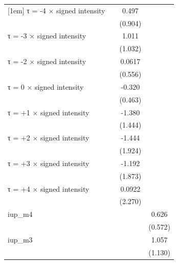 \begin{table}[htbp]
\begin{tabular}{l*{3}{c}}
[1em]
τ = -4 × signed intensity&                     &       0.497         &                     \\
                    &                     &     (0.904)         &                     \\
[1em]
τ = -3 × signed intensity&                     &       1.011         &                     \\
                    &                     &     (1.032)         &                     \\
[1em]
τ = -2 × signed intensity&                     &      0.0617         &                     \\
                    &                     &     (0.556)         &                     \\
[1em]
τ = 0 × signed intensity&                     &      -0.320         &                     \\
                    &                     &     (0.463)         &                     \\
[1em]
τ = +1 × signed intensity&                     &      -1.380         &                     \\
                    &                     &     (1.444)         &                     \\
[1em]
τ = +2 × signed intensity&                     &      -1.444         &                     \\
                    &                     &     (1.924)         &                     \\
[1em]
τ = +3 × signed intensity&                     &      -1.192         &                     \\
                    &                     &     (1.873)         &                     \\
[1em]
τ = +4 × signed intensity&                     &      0.0922         &                     \\
                    &                     &     (2.270)         &                     \\
[1em]
iup\_m4              &                     &                     &       0.626         \\
                    &                     &                     &     (0.572)         \\
[1em]
iup\_m3              &                     &                     &       1.057         \\
                    &                     &                     &     (1.130)         \\

\end{tabular}
\end{table}
